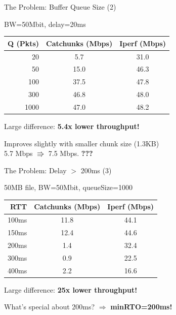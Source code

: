 \begin{frame}[fragile]{The Problem: Buffer Queue Size (2)}

BW=50Mbit, delay=20ms

\begin{tabular}{rcc}
\toprule
\textbf{Q (Pkts)} & \textbf{Catchunks (Mbps)} & \textbf{Iperf (Mbps)} \\ 
\midrule
  20  &  5.7  & 31.0 \\
  50	& 15.0  & 46.3 \\
 100	& 37.5  & 47.8 \\
 300	& 46.8	& 48.0 \\
1000	& 47.0	& 48.2 \\
\bottomrule
\end{tabular}
\vspace*{1em}

Large difference: \textbf{5.4x lower throughput!}

\pause
Improves slightly with smaller chunk size (1.3KB)\\ 5.7 Mbps $\Rrightarrow$ 7.5 Mbps. 
\textbf{???}

\end{frame}



\begin{frame}[fragile]{The Problem: Delay $>$ 200ms (3)}

50MB file, BW=50Mbit, queueSize=1000
\vspace{1em}

\begin{tabular}{rcc}
\toprule
\textbf{RTT} & \textbf{Catchunks (Mbps)} & \textbf{Iperf (Mbps)} \\ 
\midrule
100ms &  11.8 & 44.1 \\
150ms &  12.4 & 44.6\\
200ms &  1.4  & 32.4 \\
300ms &  0.9  & 22.5 \\
400ms	&  2.2	&	16.6 \\
\bottomrule
\end{tabular}

\vspace*{1em}

Large difference: \textbf{25x lower throughput!}

\pause
\vspace*{.5em}

What's special about 200ms? $\Rightarrow$ \textbf{minRTO=200ms!} 

\end{frame}





